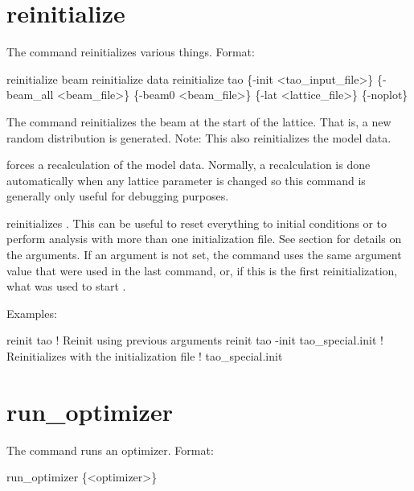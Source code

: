 \section{reinitialize}
\label{s:reinit}

The  command reinitializes various things. Format:
\begin{example}
  reinitialize beam
  reinitialize data
  reinitialize tao \{-init <tao_input_file>\} \{-beam_all <beam_file>\} 
     \{-beam0 <beam_file>\} \{-lat <lattice_file>\} \{-noplot\}
\end{example}

\vskip 0.2in 

The  command reinitializes the beam at the start
of the lattice. That is, a new random distribution is generated. 
Note: This also reinitializes the model data.

 forces a recalculation of the model data.
Normally, a recalculation is done automatically when any lattice
parameter is changed so this command is generally only useful for
debugging purposes.

 reinitializes \tao. This can be useful to reset
everything to initial conditions or to perform analysis with more than
one initialization file.  See section  for
details on the arguments.  If an argument is not set, the
 command uses the same argument value that were used in
the last  command, or, if this is the first
reinitialization, what was used to start \tao. 

Examples:
\begin{example}
  reinit tao                         ! Reinit using previous arguments
  reinit tao -init tao_special.init  ! Reinitializes \tao with the initialization file 
                                     !   tao_special.init
\end{example}


\section{run_optimizer}
\label{s:run}

The  command runs an optimizer. Format:
\begin{example}
  run_optimizer \{<optimizer>\}
\end{example}

